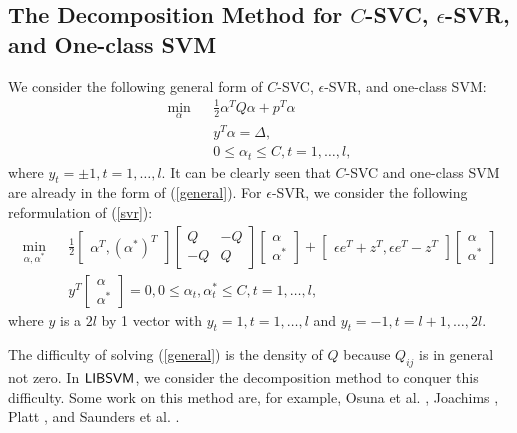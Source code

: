 \documentclass[11pt]{article}
\newcommand{\libsvm}{$\mbox{{\sf LIBSVM}}$}
\theoremstyle{break}
\begin{document}
\subsection{The Decomposition Method
for $C$-SVC, $\epsilon$-SVR, and 
One-class SVM}

We consider the following general form
of $C$-SVC, $\epsilon$-SVR, and one-class
SVM:
\begin{eqnarray}
\min_{\alpha} && \frac{1}{2}
\alpha^T Q \alpha + p^T \alpha 
\nonumber \\
&& y^T \alpha = \Delta,
  \label{general} \\
&& 0 \leq \alpha_t \leq C, t 
= 1, \ldots, l, \nonumber 
\end{eqnarray}
where $y_t = 
\pm 1, t = 1, \ldots, l$.
It can be clearly seen that
$C$-SVC and one-class SVM are
already in the form of (\ref{general}).
For $\epsilon$-SVR, we consider the following 
reformulation of 
(\ref{svr}):
\begin{eqnarray}
 \min_{\alpha, \alpha^*} && \frac{1}{2}
\begin{bmatrix}
\alpha^T, (\alpha^*)^T
\end{bmatrix}
\begin{bmatrix}
Q & -Q \nonumber \\
-Q & Q 
\end{bmatrix}
\begin{bmatrix}
\alpha \\ 
\alpha^*
\end{bmatrix}
+
\begin{bmatrix}
\epsilon e^T + z^T,
\epsilon e^T - z^T
\end{bmatrix}
\begin{bmatrix}
\alpha \\ \alpha^*
\end{bmatrix}
 \\
&& 
y^T 
\begin{bmatrix}
\alpha \\ \alpha^*
\end{bmatrix}
= 0,0 \leq \alpha_t,
\alpha_t^* \leq C, t = 1, \ldots,l,   
\label{svr1}
\end{eqnarray}
where
$y$ is a $2l$ by 1 vector with
$y_t = 1, t = 1, 
\ldots, l$ and $y_t = -1,
t = l+1, \ldots, 2l$.

The difficulty of 
solving (\ref{general}) is the density of
$Q$ because $Q_{ij}$ is in general not zero.
In \libsvm, we consider the decomposition 
method to conquer this difficulty.
Some work on this method are, for example, 
Osuna et al.
\citeyear{EO97a},
Joachims \citeyear{TJ98a},
Platt \citeyear{JP98a},
and Saunders et al. \citeyear{CS98a}.
\end{document}
